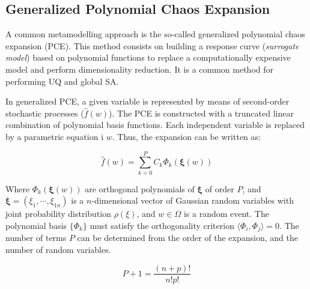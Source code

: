 \documentclass[12pt]{article}
\begin{document}
  \subsection{Generalized Polynomial Chaos Expansion}
  
A common metamodelling approach is the so-called generalized polynomial chaos expansion (PCE). This method consists on building a response curve (\textit{surrogate model}) based on polynomial functions to replace a computationally expensive model and perform dimensionality reduction. It is a common method for performing UQ and global SA.

In generalized PCE, a given variable is represented by means of second-order stochastic processes ($\hat f(w)$). The PCE is constructed with a truncated linear combination of polynomial basis functions. Each independent variable is replaced by a parametric equation i $w$. Thus, the expansion can be written as:


\begin{equation}
\hat f(w)=\sum^{P}_{k=0}C_{k}\Phi_{k}(\mathbf{\xi}(w))
\end{equation}

Where $\Phi_{k}(\mathbf{\xi}(w))$ are orthogonal polynomials of $\mathbf{\xi}$ of order $P$, and $\mathbf{\xi}=(\xi_{1},\cdots,\xi_{1n})$ is a $n$-dimensional vector of Gaussian random variables with joint probability distribution  $\rho(\xi)$, and $w \in \Omega$ is a random event. %
The polynomial basis $\{\Phi_{k}\}$ must satisfy the orthogonality criterion $\langle \Phi_{i},\Phi_{j} \rangle=0$. The number of terms $P$ can be determined from the  order of the expansion, and the number of random variables. 

\begin{equation}
	P+1=\frac{(n+p)!}{n!p!}
\end{equation}
\end{document}
